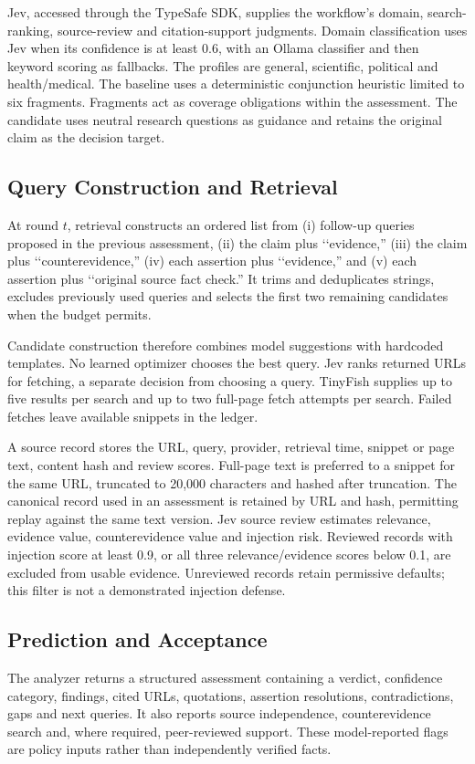 \documentclass[conference]{IEEEtran}
\begin{document}
Jev, accessed through the TypeSafe SDK, supplies the workflow's domain, search-ranking, source-review and citation-support judgments. Domain classification uses Jev when its confidence is at least 0.6, with an Ollama classifier and then keyword scoring as fallbacks. The profiles are general, scientific, political and health/medical. The baseline uses a deterministic conjunction heuristic limited to six fragments. Fragments act as coverage obligations within the assessment. The candidate uses neutral research questions as guidance and retains the original claim as the decision target.

\subsection{Query Construction and Retrieval}
At round $t$, retrieval constructs an ordered list from (i) follow-up queries proposed in the previous assessment, (ii) the claim plus \lq\lq evidence,'' (iii) the claim plus \lq\lq counterevidence,'' (iv) each assertion plus \lq\lq evidence,'' and (v) each assertion plus \lq\lq original source fact check.'' It trims and deduplicates strings, excludes previously used queries and selects the first two remaining candidates when the budget permits.

Candidate construction therefore combines model suggestions with hardcoded templates. No learned optimizer chooses the best query. Jev ranks returned URLs for fetching, a separate decision from choosing a query. TinyFish supplies up to five results per search and up to two full-page fetch attempts per search. Failed fetches leave available snippets in the ledger.

A source record stores the URL, query, provider, retrieval time, snippet or page text, content hash and review scores. Full-page text is preferred to a snippet for the same URL, truncated to 20,000 characters and hashed after truncation. The canonical record used in an assessment is retained by URL and hash, permitting replay against the same text version. Jev source review estimates relevance, evidence value, counterevidence value and injection risk. Reviewed records with injection score at least 0.9, or all three relevance/evidence scores below 0.1, are excluded from usable evidence. Unreviewed records retain permissive defaults; this filter is not a demonstrated injection defense.

\subsection{Prediction and Acceptance}
The analyzer returns a structured assessment containing a verdict, confidence category, findings, cited URLs, quotations, assertion resolutions, contradictions, gaps and next queries. It also reports source independence, counterevidence search and, where required, peer-reviewed support. These model-reported flags are policy inputs rather than independently verified facts.
\end{document}
